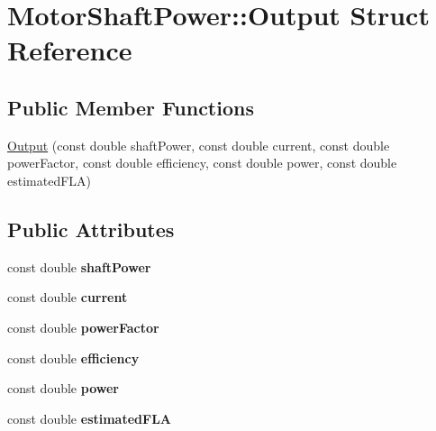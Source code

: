 \hypertarget{struct_motor_shaft_power_1_1_output}{}\section{Motor\+Shaft\+Power\+:\+:Output Struct Reference}
\label{struct_motor_shaft_power_1_1_output}
\subsection*{Public Member Functions}
\begin{DoxyCompactItemize}
\item 
\hyperlink{struct_motor_shaft_power_1_1_output_aaae77bc7a98e39eaca9f6ad4da9cc1d7}{Output} (const double shaft\+Power, const double current, const double power\+Factor, const double efficiency, const double power, const double estimated\+F\+LA)
\end{DoxyCompactItemize}
\subsection*{Public Attributes}
\begin{DoxyCompactItemize}
\item 
\mbox{\label{struct_motor_shaft_power_1_1_output_a9f24851400a9d1f70cc685a0192e35c4}} 
const double {\bfseries shaft\+Power}
\item 
\mbox{\label{struct_motor_shaft_power_1_1_output_a8b1d0a174e3c91bd18ea06b560478c21}} 
const double {\bfseries current}
\item 
\mbox{\label{struct_motor_shaft_power_1_1_output_a603a8e7219d775f20f965bd75a1204f4}} 
const double {\bfseries power\+Factor}
\item 
\mbox{\label{struct_motor_shaft_power_1_1_output_abb253d637322c453d33afa78d16b4b85}} 
const double {\bfseries efficiency}
\item 
\mbox{\label{struct_motor_shaft_power_1_1_output_abaab2f27d778f41e56ff7a7398a4713a}} 
const double {\bfseries power}
\item 
\mbox{\label{struct_motor_shaft_power_1_1_output_a9fc50f9df95d6507017c5a3c306bbc7f}} 
const double {\bfseries estimated\+F\+LA}
\end{DoxyCompactItemize}



